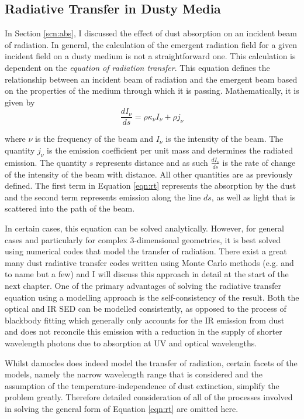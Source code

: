 \subsection{Radiative Transfer in Dusty Media}
\label{scn:rt}
In Section \ref{scn:abs}, I discussed the effect of dust absorption on an incident beam of radiation.  In general, the calculation of the emergent radiation field for a given incident field on a dusty medium is not a straightforward one.  This calculation is dependent on the {\em equation of radiation transfer}.  This equation defines the relationship between an incident beam of radiation and the emergent beam based on the properties of the medium through which it is passing.  Mathematically, it is given by 
\begin{equation}
\label{eqn:rt}
\frac{dI_{\nu}}{ds}=\rho \kappa_{\nu} I_{\nu} + \rho j_{\nu}
\end{equation}
 
\noindent where $\nu$ is the frequency of the beam and $I_{\nu}$ is the intensity of the beam.  The quantity $j_{\nu}$ is the emission coefficient per unit mass and determines the radiated emission.  The quantity $s$ represents distance and as such $\frac{dI_{\nu}}{ds}$ is the rate of change of the intensity of the beam with distance.  All other quantities are as previously defined.  The first term in Equation \ref{eqn:rt} represents the absorption by the dust and the second term represents emission along the line $ds$, as well as light that is scattered into the path of the beam.

In certain cases, this equation can be solved analytically.  However, for general cases and particularly for complex 3-dimensional geometries, it is best solved using numerical codes that model the transfer of radiation.  There exist a great many dust radiative transfer codes written using Monte Carlo methods (e.g. \citealt{Harries2000,Wood2001,Baes2003,Wood2004,Ercolano2005} and \citealt{Robitaille2011} to name but a few) and I will discuss this approach in detail at the start of the next chapter.  One of the primary advantages of solving the radiative transfer equation using a modelling approach is the self-consistency of the result.  Both the optical and IR SED can be modelled consistently, as opposed to the process of blackbody fitting which generally only accounts for the IR emission from dust and does not reconcile this emission with a reduction in the supply of shorter wavelength photons due to absorption at UV and optical wavelengths.

Whilst {\sc damocles} does indeed model the transfer of radiation, certain facets of the models, namely the narrow wavelength range that is considered and the assumption of the temperature-independence of dust extinction, simplify the problem greatly. Therefore detailed consideration of all of the processes involved in solving the general form of Equation \ref{eqn:rt} are omitted here.

